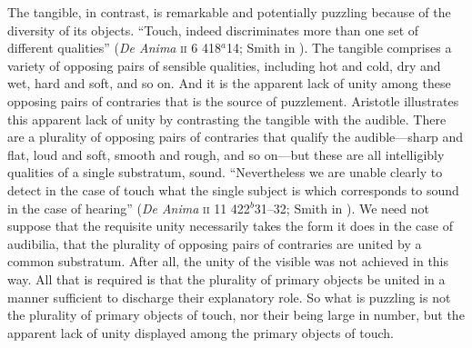 The tangible, in contrast, is remarkable and potentially puzzling because of the diversity of its objects. ``Touch, indeed discriminates more than one set of different qualities'' (\emph{De Anima} \textsc{ii} 6 418\( ^{a} \)14; Smith in \citealt[32]{Barnes:1984uq}). The tangible comprises a variety of opposing pairs of sensible qualities, including hot and cold, dry and wet, hard and soft, and so on. And it is the apparent lack of unity among these opposing pairs of contraries that is the source of puzzlement. Aristotle illustrates this apparent lack of unity by contrasting the tangible with the audible. There are a plurality of opposing pairs of contraries that qualify the audible---sharp and flat, loud and soft, smooth and rough, and so on---but these are all intelligibly qualities of a single substratum, sound. ``Nevertheless we are unable clearly to detect in the case of touch what the single subject is which corresponds to sound in the case of hearing'' (\emph{De Anima} \textsc{ii} 11 422\( ^{b} \)31--32; Smith in \citealt[40]{Barnes:1984uq}). We need not suppose that the requisite unity necessarily takes the form it does in the case of audibilia, that the plurality of opposing pairs of contraries are united by a common substratum. After all, the unity of the visible was not achieved in this way. All that is required is that the plurality of primary objects be united in a manner sufficient to discharge their explanatory role. So what is puzzling is not the plurality of primary objects of touch, nor their being large in number, but the apparent lack of unity displayed among the primary objects of touch.

